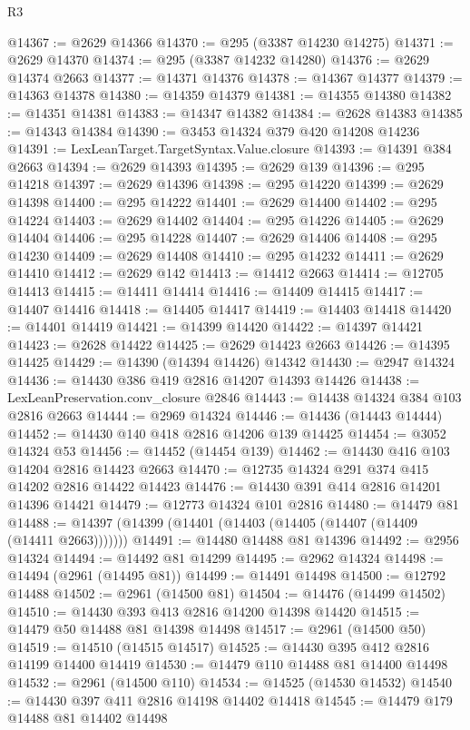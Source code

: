\begin{lexlean}{R3}
\begin{coremodule}
@14367 := @2629 @14366
@14370 := @295 (@3387 @14230 @14275)
@14371 := @2629 @14370
@14374 := @295 (@3387 @14232 @14280)
@14376 := @2629 @14374 @2663
@14377 := @14371 @14376
@14378 := @14367 @14377
@14379 := @14363 @14378
@14380 := @14359 @14379
@14381 := @14355 @14380
@14382 := @14351 @14381
@14383 := @14347 @14382
@14384 := @2628 @14383
@14385 := @14343 @14384
@14390 := @3453 @14324 @379 @420 @14208 @14236
@14391 := LexLeanTarget.TargetSyntax.Value.closure
@14393 := @14391 @384 @2663
@14394 := @2629 @14393
@14395 := @2629 @139
@14396 := @295 @14218
@14397 := @2629 @14396
@14398 := @295 @14220
@14399 := @2629 @14398
@14400 := @295 @14222
@14401 := @2629 @14400
@14402 := @295 @14224
@14403 := @2629 @14402
@14404 := @295 @14226
@14405 := @2629 @14404
@14406 := @295 @14228
@14407 := @2629 @14406
@14408 := @295 @14230
@14409 := @2629 @14408
@14410 := @295 @14232
@14411 := @2629 @14410
@14412 := @2629 @142
@14413 := @14412 @2663
@14414 := @12705 @14413
@14415 := @14411 @14414
@14416 := @14409 @14415
@14417 := @14407 @14416
@14418 := @14405 @14417
@14419 := @14403 @14418
@14420 := @14401 @14419
@14421 := @14399 @14420
@14422 := @14397 @14421
@14423 := @2628 @14422
@14425 := @2629 @14423 @2663
@14426 := @14395 @14425
@14429 := @14390 (@14394 @14426) @14342
@14430 := @2947 @14324
@14436 := @14430 @386 @419 @2816 @14207 @14393 @14426
@14438 := LexLeanPreservation.conv_closure @2846
@14443 := @14438 @14324 @384 @103 @2816 @2663
@14444 := @2969 @14324
@14446 := @14436 (@14443 @14444)
@14452 := @14430 @140 @418 @2816 @14206 @139 @14425
@14454 := @3052 @14324 @53
@14456 := @14452 (@14454 @139)
@14462 := @14430 @416 @103 @14204 @2816 @14423 @2663
@14470 := @12735 @14324 @291 @374 @415 @14202 @2816 @14422 @14423
@14476 := @14430 @391 @414 @2816 @14201 @14396 @14421
@14479 := @12773 @14324 @101 @2816
@14480 := @14479 @81
@14488 := @14397 (@14399 (@14401 (@14403 (@14405 (@14407 (@14409 (@14411 @2663)))))))
@14491 := @14480 @14488 @81 @14396
@14492 := @2956 @14324
@14494 := @14492 @81 @14299
@14495 := @2962 @14324
@14498 := @14494 (@2961 (@14495 @81))
@14499 := @14491 @14498
@14500 := @12792 @14488
@14502 := @2961 (@14500 @81)
@14504 := @14476 (@14499 @14502)
@14510 := @14430 @393 @413 @2816 @14200 @14398 @14420
@14515 := @14479 @50 @14488 @81 @14398 @14498
@14517 := @2961 (@14500 @50)
@14519 := @14510 (@14515 @14517)
@14525 := @14430 @395 @412 @2816 @14199 @14400 @14419
@14530 := @14479 @110 @14488 @81 @14400 @14498
@14532 := @2961 (@14500 @110)
@14534 := @14525 (@14530 @14532)
@14540 := @14430 @397 @411 @2816 @14198 @14402 @14418
@14545 := @14479 @179 @14488 @81 @14402 @14498

\end{coremodule}
\end{lexlean}
